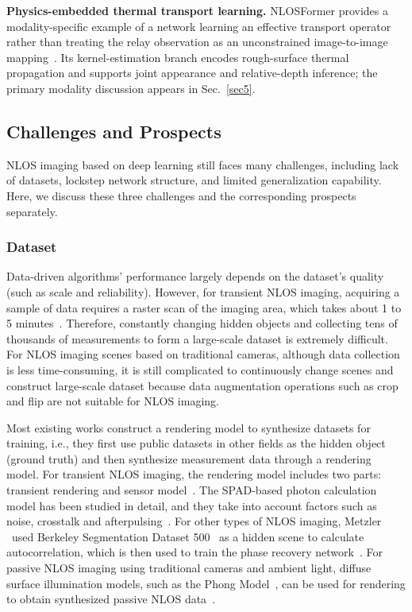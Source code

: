 \vspace{0.8mm}
\noindent \textbf{Physics-embedded thermal transport learning.}
NLOSFormer provides a modality-specific example of a network learning an effective transport operator rather than treating the relay observation as an unconstrained image-to-image mapping~\cite{yeThermalNLOSFormer2026}. Its kernel-estimation branch encodes rough-surface thermal propagation and supports joint appearance and relative-depth inference; the primary modality discussion appears in Sec.~\ref{sec5}.

\subsection{Challenges and Prospects}
NLOS imaging based on deep learning still faces many challenges, including lack of datasets, lockstep network structure, and limited generalization capability. Here, we discuss these three challenges and the corresponding prospects separately.


\subsubsection{Dataset}
Data-driven algorithms' performance largely depends on the dataset's quality (such as scale and reliability). However, for transient NLOS imaging, acquiring a sample of data requires a raster scan of the imaging area, which takes about 1 to 5 minutes~\cite{otooleConfocalNonlineofsightImaging2018,isogawaEfficientNonLineofSightImaging}. Therefore, constantly changing hidden objects and collecting tens of thousands of measurements to form a large-scale dataset is extremely difficult. For NLOS imaging scenes based on traditional cameras, although data collection is less time-consuming, it is still complicated to continuously change scenes and construct large-scale dataset because data augmentation operations such as crop and flip are not suitable for NLOS imaging.

Most existing works construct a rendering model to synthesize datasets for training, i.e., they first use public datasets in other fields as the hidden object (ground truth) and then synthesize measurement data through a rendering model. For transient NLOS imaging, the rendering model includes two parts: transient rendering and sensor model~\cite{chen_learned_2020,chopiteDeepNonLineofSightReconstruction2020}. The SPAD-based photon calculation model has been studied in detail, and they take into account factors such as noise, crosstalk and afterpulsing~\cite{hernandez_computational_2017}. For other types of NLOS imaging, Metzler \etal~used Berkeley Segmentation Dataset 500~\cite{martin_database_2001} as a hidden scene to calculate autocorrelation, which is then used to train the phase recovery network~\cite{metzlerDeepinverseCorrelographyRealtime2020}. For passive NLOS imaging using traditional cameras and ambient light, diffuse surface illumination models, such as the Phong Model~\cite{phongIlluminationComputerGenerated1975}, can be used for rendering to obtain synthesized passive NLOS data~\cite{zhouNonlineofsightImagingPhong2020}. 

